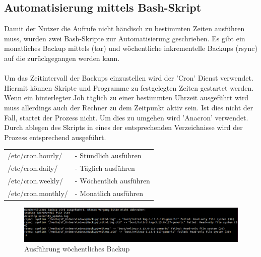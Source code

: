 \newpage %

\subsection{Automatisierung mittels Bash-Skript} %
Damit der Nutzer die Aufrufe nicht händisch zu bestimmten Zeiten ausführen muss, wurden zwei Bash-Skripte zur Automatisierung geschrieben. Es gibt ein monatliches Backup mittels (tar) und wöchentliche inkrementelle Backups (rsync) auf die zurückgegangen werden kann.\\
\\
Um das Zeitintervall der Backups einzustellen wird der 'Cron' Dienst verwendet.
Hiermit können Skripte und Programme zu festgelegten Zeiten gestartet werden.
Wenn ein hinterlegter Job täglich zu einer bestimmten Uhrzeit ausgeführt wird muss allerdings auch der Rechner zu dem Zeitpunkt aktiv sein. Ist dies nicht der Fall, startet der Prozess nicht. Um dies zu umgehen wird 'Anacron' verwendet.
Durch ablegen des Skripts in eines der entsprechenden Verzeichnisse wird der Prozess entsprechend ausgeführt. \cite{cron} \\
\begin{tabular}{l l}
/etc/cron.hourly/	&- Stündlich ausführen\\
/etc/cron.daily/	&- Täglich ausführen\\
/etc/cron.weekly/	&- Wöchentlich ausführen\\
/etc/cron.monthly/	&- Monatlich ausführen\\
\end{tabular}
\begin{figure}[ht]
\includegraphics[width=\textwidth]{pictures/Bastian/Woechentliches_Backup}
\caption{Ausführung wöchentliches Backup}
\end{figure}
